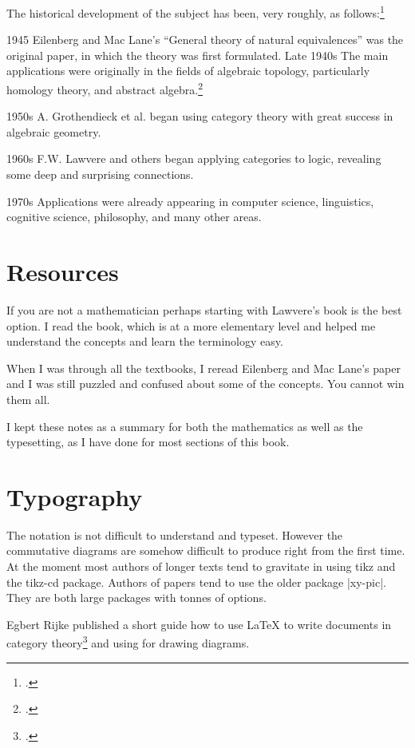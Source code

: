 The historical development of the subject has been, very roughly, as follows:\footcite{awodey2010}

1945 Eilenberg and Mac Lane’s “General theory of natural equivalences” was
the original paper, in which the theory was first formulated.
Late 1940s The main applications were originally in the fields of algebraic
topology, particularly homology theory, and abstract algebra.\footcite{samuel1945}

1950s A. Grothendieck et al. began using category theory with great success in
algebraic geometry.

1960s F.W. Lawvere and others began applying categories to logic, revealing
some deep and surprising connections.

1970s Applications were already appearing in computer science, linguistics,
cognitive science, philosophy, and many other areas.

\section*{Resources}

If you are not a mathematician perhaps starting with Lawvere's book is the best option. I read the book, which is at a more elementary level and helped me understand the concepts and learn the terminology easy.

When I was through all the textbooks, I reread Eilenberg and Mac Lane's paper and I was still puzzled and confused about some of the concepts. You cannot win them all.

I kept these notes as a summary for both the mathematics as well as the typesetting, as I have done for most sections of this book.


\section{Typography}

The notation is not difficult to understand and typeset. However the commutative diagrams are somehow difficult to produce right from the first time. At the moment most authors of longer texts tend to gravitate in using tikz and the tikz-cd package. Authors of papers tend to use the older package |xy-pic|. They are both large packages with tonnes of options. 

Egbert Rijke published a short guide how to use LaTeX to write documents in category theory\footcite{rijke2015} and using \tikzname for drawing diagrams. 

